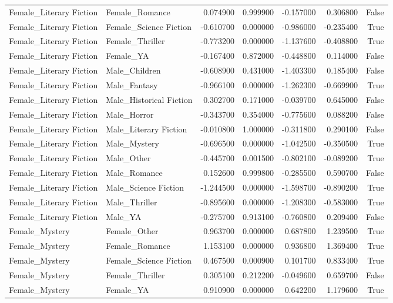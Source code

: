 \begin{tabular}{llrrrrr}
Female_Literary Fiction & Female_Romance & 0.074900 & 0.999900 & -0.157000 & 0.306800 & False \\
Female_Literary Fiction & Female_Science Fiction & -0.610700 & 0.000000 & -0.986000 & -0.235400 & True \\
Female_Literary Fiction & Female_Thriller & -0.773200 & 0.000000 & -1.137600 & -0.408800 & True \\
Female_Literary Fiction & Female_YA & -0.167400 & 0.872000 & -0.448800 & 0.114000 & False \\
Female_Literary Fiction & Male_Children & -0.608900 & 0.431000 & -1.403300 & 0.185400 & False \\
Female_Literary Fiction & Male_Fantasy & -0.966100 & 0.000000 & -1.262300 & -0.669900 & True \\
Female_Literary Fiction & Male_Historical Fiction & 0.302700 & 0.171000 & -0.039700 & 0.645000 & False \\
Female_Literary Fiction & Male_Horror & -0.343700 & 0.354000 & -0.775600 & 0.088200 & False \\
Female_Literary Fiction & Male_Literary Fiction & -0.010800 & 1.000000 & -0.311800 & 0.290100 & False \\
Female_Literary Fiction & Male_Mystery & -0.696500 & 0.000000 & -1.042500 & -0.350500 & True \\
Female_Literary Fiction & Male_Other & -0.445700 & 0.001500 & -0.802100 & -0.089200 & True \\
Female_Literary Fiction & Male_Romance & 0.152600 & 0.999800 & -0.285500 & 0.590700 & False \\
Female_Literary Fiction & Male_Science Fiction & -1.244500 & 0.000000 & -1.598700 & -0.890200 & True \\
Female_Literary Fiction & Male_Thriller & -0.895600 & 0.000000 & -1.208300 & -0.583000 & True \\
Female_Literary Fiction & Male_YA & -0.275700 & 0.913100 & -0.760800 & 0.209400 & False \\
Female_Mystery & Female_Other & 0.963700 & 0.000000 & 0.687800 & 1.239500 & True \\
Female_Mystery & Female_Romance & 1.153100 & 0.000000 & 0.936800 & 1.369400 & True \\
Female_Mystery & Female_Science Fiction & 0.467500 & 0.000900 & 0.101700 & 0.833400 & True \\
Female_Mystery & Female_Thriller & 0.305100 & 0.212200 & -0.049600 & 0.659700 & False \\
Female_Mystery & Female_YA & 0.910900 & 0.000000 & 0.642200 & 1.179600 & True \\

\end{tabular}

